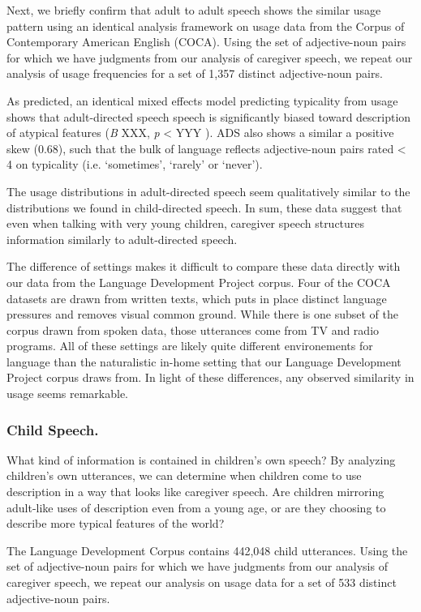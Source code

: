 \documentclass[10pt, letterpaper]{article}
\begin{document}
Next, we briefly confirm that adult to adult speech shows the similar
usage pattern using an identical analysis framework on usage data from
the Corpus of Contemporary American English (COCA). Using the set of
adjective-noun pairs for which we have judgments from our analysis of
caregiver speech, we repeat our analysis of usage frequencies for a set
of 1,357 distinct adjective-noun pairs.

As predicted, an identical mixed effects model predicting typicality
from usage shows that adult-directed speech speech is significantly
biased toward description of atypical features (\emph{B} XXX, \emph{p}
\textless{} YYY ). ADS also shows a similar a positive skew (0.68), such
that the bulk of language reflects adjective-noun pairs rated
\textless{} 4 on typicality (i.e. `sometimes', `rarely' or `never').

The usage distributions in adult-directed speech seem qualitatively
similar to the distributions we found in child-directed speech. In sum,
these data suggest that even when talking with very young children,
caregiver speech structures information similarly to adult-directed
speech.

The difference of settings makes it difficult to compare these data
directly with our data from the Language Development Project corpus.
Four of the COCA datasets are drawn from written texts, which puts in
place distinct language pressures and removes visual common ground.
While there is one subset of the corpus drawn from spoken data, those
utterances come from TV and radio programs. All of these settings are
likely quite different environements for language than the naturalistic
in-home setting that our Language Development Project corpus draws from.
In light of these differences, any observed similarity in usage seems
remarkable.

\hypertarget{child-speech.}{%
\subsubsection{Child Speech.}\label{child-speech.}}

What kind of information is contained in children's own speech? By
analyzing children's own utterances, we can determine when children come
to use description in a way that looks like caregiver speech. Are
children mirroring adult-like uses of description even from a young age,
or are they choosing to describe more typical features of the world?

The Language Development Corpus contains 442,048 child utterances. Using
the set of adjective-noun pairs for which we have judgments from our
analysis of caregiver speech, we repeat our analysis on usage data for a
set of 533 distinct adjective-noun pairs.
\end{document}
